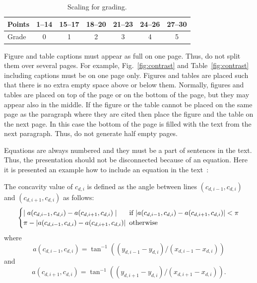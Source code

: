 \documentclass{lutmscthesis}[2017/10/03]
\begin{document}
\begin{table}[ht]
\caption{Scaling for grading.}
\vspace{-12pt}
\begin{center}
\begin{tabular}{|l|c|c|c|c|c|c|}
\hline
Points &1--14 & 15--17 & 18--20 & 21--23 & 24--26 & 27--30\\
\hline
Grade &0&1&2&3&4&5\\
\hline
\end{tabular}
\label{tab:grading}
\end{center}
\end{table}

Figure and table captions must appear as full on one page. 
Thus, do not split them over several pages. 
For example, Fig.~\ref{fig:contrast} and Table~\ref{fig:contrast} including captions must be on one page only. 
Figures and tables are placed such that there is no extra empty space above or below them. 
Normally, figures and tables are placed on top of the page or on the bottom of the page, 
but they may appear also in the middle. 
If the figure or the table cannot be placed on the same page as the paragraph 
where they are cited then place the figure and the table on the next page. 
In this case the bottom of the page is filled with the text from the next paragraph.  
Thus, do not generate half empty pages. 

Equations are always numbered and they must be a part of sentences in the text. 
Thus, the presentation should not be disconnected because of an equation. 
Here it is presented an example how to include an equation in the text~\cite{zafari2017comparison}:  

The concavity value of $c_{d,i}$ is defined as the angle between lines $(c_{d,i-1} , c_{d,i} )$ and $(c_{d,i+1} , c_{d,i})$ as follows:
\begin{align}
\label{eq:value}
\begin{cases}
\mid a(c_{d,i-1} , c_{d,i} ) - a(c_{d,i+1} , c_{d,i} )\mid & \hspace{-5pt}\text{if}  \ |a(c_{d,i-1} , c_{d,i} ) - a(c_{d,i+1} , c_{d,i} )| < \pi\\
\pi  - |a(c_{d,i-1} , c_{d,i} ) - a(c_{d,i+1} ,c_{d,i})| & \hspace{-5pt} \text{otherwise} 
\end{cases}
\end{align}
where 
\begin{equation}
a(c_{d,i-1} , c_{d,i} ) = \tan^{-1} ((y_{d,i-1} - y_{d,i} )/(x_{d,i-1} - x_{d,i} ))
\label{eq:term1}
\end{equation}
and
\begin{equation}
a(c_{d,i+1} , c_{d,i}) = \tan ^{-1} ((y_{d,i+1} - y_{d,i} )/(x_{d,i+1} - x_{d,i} )).
\end{equation}
\end{document}
